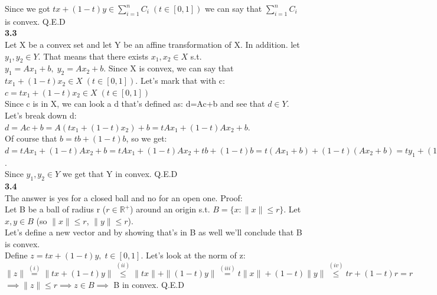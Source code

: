 \documentclass[fleqn]{article}
\begin{document}
Since we got $tx + (1-t)y \in \sum_{i=1}^n C_i \; (t\in[0,1])$ we can say that $ \sum_{i=1}^n C_i$ is convex. Q.E.D\\


\textbf{3.3} \\
Let X be a convex set and let Y be an affine transformation of X. In addition. let $y_1,y_2 \in Y$. That means that there exists $x_1,x_2 \in X$ s.t. $y_1 = Ax_1+b, \; y_2 = Ax_2 +b$. Since X is convex, we can say that $tx_1 + (1-t)x_2 \in X \;(t \in [0,1])$. Let's mark that with c:\\
$c=tx_1 + (1-t)x_2 \in X \;(t \in [0,1])$\\

Since c is in X, we can look a d that's defined as: d=Ac+b and see that $d \in Y$.
Let's break down d:\\
$d = Ac+b = A(tx_1 + (1-t)x_2)+b = tAx_1 + (1-t)Ax_2+b$.\\

Of course that $b = tb +(1-t)b$, so we get: \\

$d = tAx_1 + (1-t)Ax_2+b = tAx_1 + (1-t)Ax_2+tb +(1-t)b = t(Ax_1+b)+(1-t)(Ax_2+b) = 
ty_1+(1-t)y_2, \; (t\in[0,1])$.\\

Since $y_1,y_2 \in Y$ we get that Y in convex. Q.E.D\\

\textbf{3.4} \\

The answer is yes for a closed ball and no for an open one. Proof:\\

Let B be a ball of radius r ($r \in \mathbb{R}^+$) around an origin s.t. $B=\{ x : \|x\| \leq r \}$. Let $x,y \in B$ (so $\|x\| \leq r$, $\|y\| \leq r$).\\

Let's define a new vector and by showing that's in B as well we'll conclude that B is convex.\\

Define $z=tx+(1-t)y, \; t \in [0,1]$. Let's look at the norm of z:\\

$\|z\| \stackrel{(i)}{=} \|tx+(1-t)y\| \stackrel{(ii)}{\leq}  \|tx\|+\|(1-t)y\| \stackrel{(iii)}{=} t\|x\|+(1-t)\|y\| \stackrel{(iv)}{\leq} tr+(1-t)r = r$\\
$\implies \|z\| \leq r \implies z \in B \implies$ B in convex. Q.E.D\\
\end{document}
